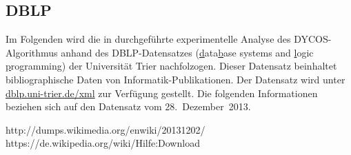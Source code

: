 \subsection{DBLP}
Im Folgenden wird die in \cite{aggarwal2011} durchgeführte
experimentelle Analyse des DYCOS-Algorithmus anhand des DBLP-Datensatzes
(\underline{d}ata\underline{b}ase systems and \underline{l}ogic \underline{p}rogramming)
der Universität Trier nachfolzogen. Dieser Datensatz beinhaltet
bibliographische Daten von Informatik-Publikationen. Der Datensatz
wird unter \href{http://dblp.uni-trier.de/xml/}{dblp.uni-trier.de/xml}
zur Verfügung gestellt. Die folgenden Informationen beziehen sich
auf den Datensatz vom 28.~Dezember~2013.

http://dumps.wikimedia.org/enwiki/20131202/
https://de.wikipedia.org/wiki/Hilfe:Download

